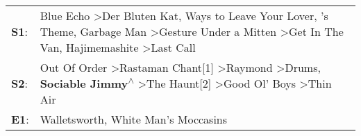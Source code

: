 \begin{supertabular}{p{0.03\textwidth}p{0.92\textwidth}}
 \textbf{S1}:  &  Blue Echo\textsuperscript{} \textgreater \enspace Der Bluten Kat\textsuperscript{},  Ways to Leave Your Lover\textsuperscript{}, 's Theme\textsuperscript{}, \enspace Garbage Man\textsuperscript{} \textgreater \enspace Gesture Under a Mitten\textsuperscript{} \textgreater \enspace Get In The Van\textsuperscript{}, \enspace Hajimemashite\textsuperscript{} \textgreater \enspace Last Call\textsuperscript{}  \enspace  \\
 \textbf{S2}:  &                               Out Of Order\textsuperscript{} \textgreater \enspace Rastaman Chant[1]\textsuperscript{} \textgreater \enspace Raymond\textsuperscript{} \textgreater \enspace Drums\textsuperscript{}, \enspace \textbf{Sociable Jimmy\textsuperscript{$\wedge$}} \textgreater \enspace The Haunt[2]\textsuperscript{} \textgreater \enspace Good Ol' Boys\textsuperscript{} \textgreater \enspace Thin Air\textsuperscript{}  \enspace  \\
 \textbf{E1}:  &                                                                                                                                                                                                                                                                                                                                                             Walletsworth\textsuperscript{}, \enspace White Man's Moccasins\textsuperscript{}  \enspace  \\
\end{supertabular}
